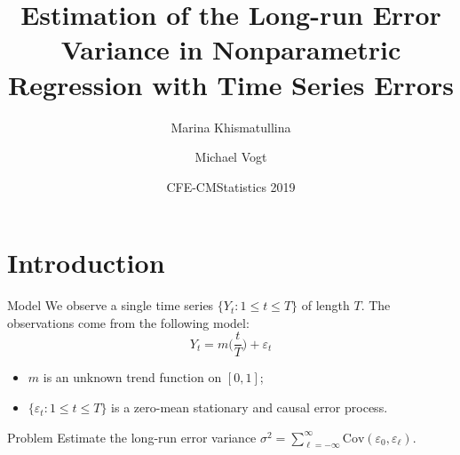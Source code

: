 \documentclass[10pt]{beamer}
\title{Estimation of the Long-run Error Variance in Nonparametric Regression with Time Series Errors}
\date{CFE-CMStatistics 2019}
\author{Marina Khismatullina \inst{1} \and Michael Vogt \inst{1}}
\institute{\inst{1} University of Bonn}
\newcommand{\Cov}{\mathrm{Cov}}
\begin{document}
\maketitle


\section{Introduction}



%	

\begin{frame}{Model}
We observe a single time series $\{Y_t: 1 \le t \le T \}$ of length $T$. The observations come from the following model:
\begin{equation*}\label{model1}
Y_t = m \Big( \frac{t}{T} \Big) + \varepsilon_t 
\end{equation*}
\vspace{-6mm}
\begin{itemize}
\item $m$ is an unknown trend function on $[0,1]$;
\item $\{ \varepsilon_t: 1 \le t \le T \}$ is a zero-mean stationary and causal error process.\pause
\end{itemize}\begin{block}{Problem}
Estimate the long-run error variance $\sigma^2 = \sum\nolimits_{\ell=-\infty}^{\infty} \Cov(\varepsilon_0,\varepsilon_{\ell})$.
\end{block}

\end{frame}
\end{document}
